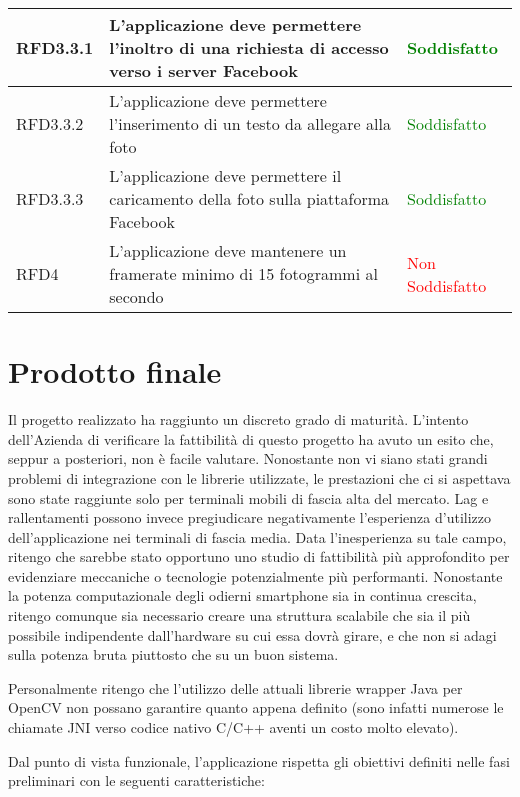 \begin{center}
\begin{longtable}{ | p{2cm} | p{7cm} | p{2cm} |}
    RFD3.3.1 &  L'applicazione deve permettere l'inoltro di una richiesta di accesso verso i server Facebook & \textcolor{green}{Soddisfatto} \\ \hline
    RFD3.3.2 &  L'applicazione deve permettere l'inserimento di un testo da allegare alla foto & \textcolor{green}{Soddisfatto} \\ \hline
    RFD3.3.3 &  L'applicazione deve permettere il caricamento della foto sulla piattaforma Facebook & \textcolor{green}{Soddisfatto} \\ \hline
    RFD4 &  L'applicazione deve mantenere un framerate minimo di 15 fotogrammi al secondo & \textcolor{red}{Non Soddisfatto} \\ \hline
    \end{longtable}
\end{center}


\newpage
\section{Prodotto finale}

Il progetto realizzato ha raggiunto un discreto grado di maturità. L'intento dell'Azienda di verificare la fattibilità di questo progetto ha avuto un esito che, seppur a posteriori, non è facile valutare. Nonostante non vi siano stati grandi problemi di integrazione con le librerie utilizzate, le prestazioni che ci si aspettava sono state raggiunte solo per terminali mobili di fascia alta del mercato. Lag e rallentamenti possono invece pregiudicare negativamente l'esperienza d'utilizzo dell'applicazione nei terminali di fascia media. Data l'inesperienza su tale campo, ritengo che sarebbe stato opportuno uno studio di fattibilità più approfondito per evidenziare meccaniche o tecnologie potenzialmente più performanti. Nonostante la potenza computazionale degli odierni smartphone sia in continua crescita, ritengo comunque sia necessario creare una struttura scalabile che sia il più possibile indipendente dall'hardware su cui essa dovrà girare, e che non si adagi sulla potenza bruta piuttosto che su un buon sistema. 

Personalmente ritengo che l'utilizzo delle attuali librerie wrapper Java per OpenCV non possano garantire quanto appena definito (sono infatti numerose le chiamate JNI verso codice nativo C/C++ aventi un costo molto elevato). 

Dal punto di vista funzionale, l'applicazione rispetta gli obiettivi definiti nelle fasi preliminari con le seguenti caratteristiche:

